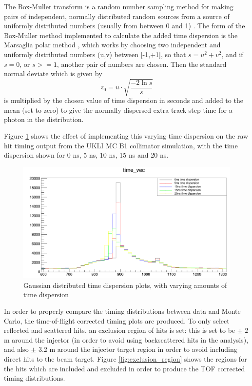 The Box-Muller transform is a random number sampling method for making pairs of independent, normally distributed random sources from a source of uniformly distributed numbers (usually from between 0 and 1) \cite{10.1214/aoms/1177706645}. The form of the Box-Muller method implemented to calculate the added time dispersion is the Marsaglia polar method \cite{doi:10.1137/1006063}, which works by choosing two independent and uniformly distributed numbers (u,v) between [-1,+1], so that $s = u^{2} + v^{2}$, and if $s=0$, or $s>=1$, another pair of numbers are chosen. Then the standard normal deviate which is given by $$z_{0}=u \cdot \sqrt{\frac{-2 \ln s}{s}}$$ is multiplied by the chosen value of time dispersion in seconds and added to the mean (set to zero) to give the normally dispersed extra track step time for a photon in the distribution. 

Figure \ref{fig:gauss_time_dispersion} shows the effect of implementing this varying time dispersion on the raw hit timing output from the UKLI MC B1 collimator simulation, with the time dispersion shown for 0 ns, 5 ns, 10 ns, 15 ns and 20 ns. 

\begin{figure}
    \centering
    \includegraphics[width=\textwidth]{Figures/gauss_time_dispersion.PNG}
    \caption{Gaussian distributed time dispersion plots, with varying amounts of time dispersion}
    \label{fig:gauss_time_dispersion}
\end{figure}

In order to properly compare the timing distributions between data and Monte Carlo, the time-of-flight corrected timing plots are produced. To only select reflected and scattered hits, an exclusion region of hits is set: this is set to be $\pm$ 2 m around the injector (in order to avoid using backscattered hits in the analysis), and also $\pm$ 3.2 m around the injector target region in order to avoid including direct hits to the beam target. Figure \ref{fig:exclusion_region} shows the regions for the hits which are included and excluded in order to produce the TOF corrected timing distributions.

